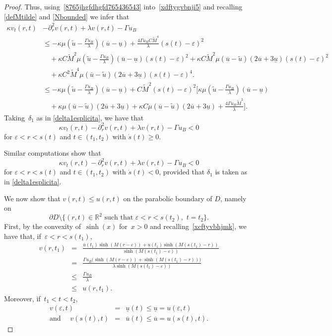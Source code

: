 \documentclass[12pt,a4paper,intlimits,sumlimits]{amsart}
\def \R {\mathbb{R}}
\theoremstyle{definition}
\theoremstyle{plain}
\numberwithin{equation}{section}
\renewcommand{\leq}{\leqslant}
\renewcommand{\geq}{\geqslant}
\begin{document}
\begin{proof}
Thus, using~\eqref{8765jhgfdhgfd765436543} into~\eqref{xdftygvbnji5} and recalling \eqref{defMtilde} and \eqref{Nbounded}
 we infer that
\[
\begin{aligned}
\kappa v_t(r,t)&-\partial^2_r v(r,t)+\lambda v(r,t)-\Gamma u_B \\
&\leq -\kappa\mu\left(\widetilde u-\frac{\Gamma u_B}{\lambda} \right)(\overline{u}- \underline{u})+\frac{4\Gamma u_B C\widetilde M^4}{\lambda}(s(t)-\varepsilon)^2 \\
&\quad +\kappa C\widetilde M^2 \mu\left(\widetilde u-\frac{\Gamma u_B}{\lambda} \right)(\overline u-\underline u)(s(t)-\varepsilon)^2
+\kappa C\widetilde M^2 \mu (\overline u-\widetilde u)(2\overline u+3\underline u)(s(t)-\varepsilon)^2 \\
&\quad +\kappa C^2 \widetilde M^4\mu(\overline u-\widetilde u)(2\overline u+3\underline u)(s(t)-\varepsilon)^4.
\\
&\leq -\kappa\mu\left(\widetilde u-\frac{\Gamma u_B}{\lambda} \right)(\overline{u}- \underline{u})+C\widetilde M^2(s(t)-\varepsilon)^2 
\Bigg[\kappa\mu\left(\widetilde u-\frac{\Gamma u_B}{\lambda} \right)(\overline u-\underline u) \\
&\quad +\kappa  \mu(\overline u-\widetilde u)(2\overline u+3\underline u)+\kappa C\mu(\overline u-\widetilde u)(2\overline u+3\underline u)
+\frac{4\Gamma u_B \widetilde M^2}{\lambda}
\Bigg].
\end{aligned}
\]
Taking~$\delta_1$ as in \eqref{delta1esplicita}, we have that
\[
\kappa v_t(r,t)-\partial^2_r v(r,t)+\lambda v(r,t)-\Gamma u_B<0
\]
for $\varepsilon<r<s(t)$ and $t\in(t_1,t_2)$ with $\dot s(t)\geq 0$.

Similar computations show that 
\[
\kappa v_t(r,t)-\partial^2_r v(r,t)+\lambda v(r,t)-\Gamma u_B<0
\]
for $\varepsilon<r<s(t)$ and $t\in(t_1,t_2)$ with $\dot s(t)< 0$, provided that $\delta_1$ is taken as in \eqref{delta1esplicita}.

We now show that $v(r, t)\leq u(r, t)$ on the parabolic boundary of $D$, namely on 
\[
\partial D\setminus \{(r,t)\in \R^2 \mbox{ such that } \varepsilon<r<s(t_2),\,\,t=t_2\}.
\]
First, by the convexity of~$\sinh(x)$ for~$x>0$ and recalling~\eqref{xcftyvbhjmk}, we have that, if~$\varepsilon<r<s(t_1)$,
\begin{eqnarray*}
v(r,t_1)&=&
\frac{\overline{u}(t_1)\sinh(M(r-\varepsilon))+\underline{u}(t_1)\sinh(M(s(t_1)-r))}{\sinh(M(s(t_1)-\varepsilon))}
\\&=&
\frac{\Gamma u_B\big(\sinh(M(r-\varepsilon))+\sinh(M(s(t_1)-r))\big)}{\lambda\sinh(M(s(t_1)-\varepsilon))}\\
&\leq& \frac{\Gamma u_B}{\lambda}\\&\leq& u(r,t_1). 
\end{eqnarray*}
Moreover, if~$t_1<t<t_2$,
\begin{eqnarray*}
v(\varepsilon,t)&=&\underline{u}(t)\leq \underline{u}=u(\varepsilon,t)
\\ {\mbox{and }}\quad
v(s(t),t)&=&\overline{u}(t)\leq \overline{u}=u(s(t),t).
\end{eqnarray*}


\end{proof}
\end{document}
